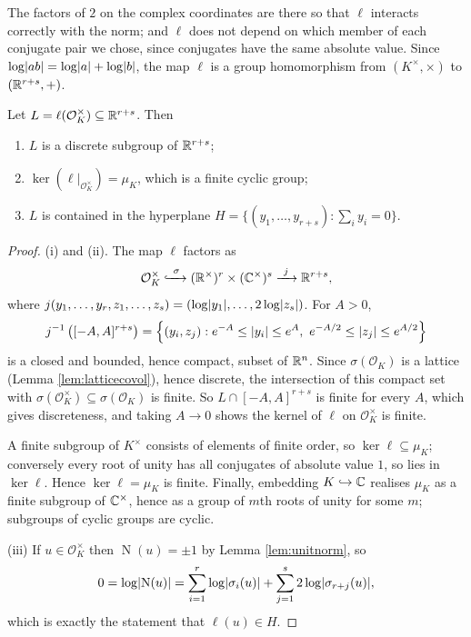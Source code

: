 \documentclass[a4paper]{scrartcl}
\renewcommand{\OO}{\mathcal{O}}
\newcommand{\Nm}{\operatorname{N}}
\begin{document}
The factors of $2$ on the complex coordinates are there so that $\ell$ interacts correctly with the norm; and $\ell$ does not depend on which member of each conjugate pair we chose, since conjugates have the same absolute value. Since $\log\lvert ab\rvert = \log\lvert a\rvert+\log\lvert b\rvert$, the map $\ell$ is a group homomorphism from $(K^\times,\times)$ to $(\mathbb{R}^{r+s},+)$.

\begin{lemma}\label{lem:logimage}
	Let $L = \ell(\OO_K^\times) \subseteq \R^{r+s}$. Then
	\begin{enumerate}[label=(\roman*)]
		\item $L$ is a discrete subgroup of $\mathbb{R}^{r+s}$;
		\item $\ker\left(\ell|_{\OO_K^\times}\right) = \mu_K$, which is a finite cyclic group;
		\item $L$ is contained in the hyperplane $H = \{(y_1,\dots,y_{r+s}) : \sum_iy_i = 0\}$.
	\end{enumerate}
\end{lemma}

\begin{proof}
	(i) and (ii). The map $\ell$ factors as
	$$\OO_K^\times \xhookrightarrow{\ \sigma\ } (\R^\times)^r\times(\C^\times)^s \xrightarrow{\ j\ } \R^{r+s},$$
	where $j(y_1,\dots,y_r,z_1,\dots,z_s) = (\log\lvert y_1\rvert,\dots,2\log\lvert z_s\rvert)$. For $A>0$,
	$$j^{-1}\left([-A,A]^{r+s}\right) = \left\{(y_i,z_j) : e^{-A}\le\lvert y_i\rvert\le e^A,\ e^{-A/2}\le\lvert z_j\rvert\le e^{A/2}\right\}$$
	is a closed and bounded, hence compact, subset of $\mathbb{R}^n$. Since $\sigma(\OO_K)$ is a lattice (Lemma \ref{lem:latticecovol}), hence discrete, the intersection of this compact set with $\sigma(\OO_K^\times) \subseteq \sigma(\OO_K)$ is finite. So $L \cap [-A,A]^{r+s}$ is finite for every $A$, which gives discreteness, and taking $A \to 0$ shows the kernel of $\ell$ on $\OO_K^\times$ is finite.

	A finite subgroup of $K^\times$ consists of elements of finite order, so $\ker\ell \subseteq \mu_K$; conversely every root of unity has all conjugates of absolute value $1$, so lies in $\ker\ell$. Hence $\ker\ell = \mu_K$ is finite. Finally, embedding $K \hookrightarrow \mathbb{C}$ realises $\mu_K$ as a finite subgroup of $\mathbb{C}^\times$, hence as a group of $m$th roots of unity for some $m$; subgroups of cyclic groups are cyclic.

	(iii) If $u \in \OO_K^\times$ then $\Nm(u) = \pm1$ by Lemma \ref{lem:unitnorm}, so
	$$0 = \log\abs{\Nm(u)} = \sum_{i=1}^r\log\abs{\sigma_i(u)} + \sum_{j=1}^s2\log\abs{\sigma_{r+j}(u)},$$
	which is exactly the statement that $\ell(u) \in H$. \qedhere
\end{proof}
\end{document}
